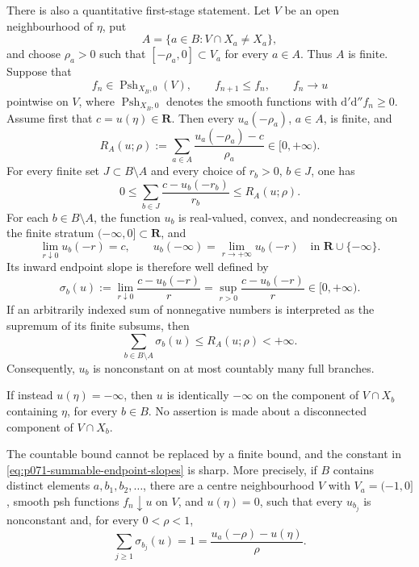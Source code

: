 \begin{theorem}
There is also a quantitative first-stage statement.  Let \(V\) be an open
neighbourhood of \(\eta\), put
\[
 A=\{a\in B:V\cap X_a\ne X_a\},
\]
and choose \(\rho_a>0\) such that
\([-\rho_a,0]\subset V_a\) for every \(a\in A\).  Thus \(A\) is finite.
Suppose that
\[
 f_n\in\operatorname{Psh}_{X_B,0}(V),
 \qquad f_{n+1}\leq f_n,
 \qquad f_n\longrightarrow u
\]
pointwise on \(V\), where
\(\operatorname{Psh}_{X_B,0}\) denotes the smooth functions with
\(\mathrm d'\mathrm d''f_n\geq0\).  Assume first that
\(c=u(\eta)\in\mathbf R\).  Then every \(u_a(-\rho_a)\), \(a\in A\), is
finite, and
\begin{equation}
\label{eq:p071-exceptional-slope-budget}
 R_A(u;\rho)
 :=\sum_{a\in A}
       \frac{u_a(-\rho_a)-c}{\rho_a}
 \in[0,+\infty).
\end{equation}
For every finite set \(J\subset B\setminus A\) and every choice of
\(r_b>0\), \(b\in J\), one has
\begin{equation}
\label{eq:p071-finite-secant-budget}
 0\leq
 \sum_{b\in J}\frac{c-u_b(-r_b)}{r_b}
 \leq R_A(u;\rho).
\end{equation}
For each \(b\in B\setminus A\), the function \(u_b\) is real-valued,
convex, and nondecreasing on the finite stratum
\((-\infty,0]\subset\mathbf R\), and
\begin{equation}
\label{eq:p071-two-endpoint-traces}
 \lim_{r\downarrow0}u_b(-r)=c,
 \qquad
 u_b(-\infty)=\lim_{r\to+\infty}u_b(-r)
 \quad\text{in }\mathbf R\cup\{-\infty\}.
\end{equation}
Its inward endpoint slope is therefore well defined by
\begin{equation}
\label{eq:p071-inward-endpoint-slope}
 \sigma_b(u)
 :=\lim_{r\downarrow0}\frac{c-u_b(-r)}{r}
 =\sup_{r>0}\frac{c-u_b(-r)}{r}
 \in[0,+\infty).
\end{equation}
If an arbitrarily indexed sum of nonnegative numbers is interpreted as the
supremum of its finite subsums, then
\begin{equation}
\label{eq:p071-summable-endpoint-slopes}
 \sum_{b\in B\setminus A}\sigma_b(u)
 \leq R_A(u;\rho)<+\infty.
\end{equation}
Consequently, \(u_b\) is nonconstant on at most countably many full
branches.

If instead \(u(\eta)=-\infty\), then \(u\) is identically \(-\infty\) on
the component of \(V\cap X_b\) containing \(\eta\), for every \(b\in B\).
No assertion is made about a disconnected component of \(V\cap X_b\).

The countable bound cannot be replaced by a finite bound, and the constant
in \eqref{eq:p071-summable-endpoint-slopes} is sharp.  More precisely, if
\(B\) contains distinct elements
\(a,b_1,b_2,\ldots\), there are a centre neighbourhood \(V\) with
\(V_a=(-1,0]\), smooth psh functions \(f_n\downarrow u\) on \(V\), and
\(u(\eta)=0\), such that every \(u_{b_j}\) is nonconstant and, for every
\(0<\rho<1\),
\begin{equation}
\label{eq:p071-sharp-slope-budget}
 \sum_{j\geq1}\sigma_{b_j}(u)
 =1
 =\frac{u_a(-\rho)-u(\eta)}{\rho}.
\end{equation}
\end{theorem}
